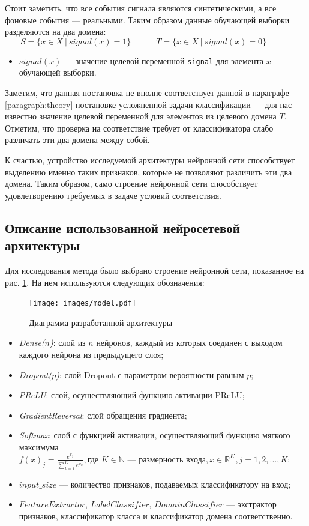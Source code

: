 \documentclass[14pt, a4paper]{extarticle}
\begin{document}
Стоит заметить, что все события сигнала являются синтетическими, а все фоновые события — реальными. Таким образом данные обучающей выборки разделяются на два домена:
\begin{equation*}
	S = \{ x \in X~|~signal(x) = 1 \} \quad \quad \quad
	T = \{ x \in X~|~signal(x) = 0 \} \quad \quad \quad
\end{equation*}
\begin{itemize}
	\item $signal(x)$ — значение целевой переменной \texttt{signal} для элемента $x$ обучающей выборки.
\end{itemize}

Заметим, что данная постановка не вполне соответствует данной в параграфе \ref{paragraph:theory} постановке усложненной задачи классификации — для нас известно значение целевой переменной для элементов из целевого домена $T$. Отметим, что проверка на соответствие требует от классификатора слабо различать эти два домена между собой.

К счастью, устройство исследуемой архитектуры нейронной сети способствует выделению именно таких признаков, которые не позволяют различить эти два домена. Таким образом, само строение нейронной сети способствует удовлетворению требуемых в задаче условий соответствия.

\subsection*{Описание использованной нейросетевой архитектуры}

Для исследования метода было выбрано строение нейронной сети, показанное на рис. \ref{fig:neural_net}. На нем используются следующих обозначения:

\begin{figure}
	\centering
	\texttt{[image: images/model.pdf]}
	\caption{Диаграмма разработанной архитектуры}
	\label{fig:neural_net}
\end{figure}

\begin{itemize}
	\item \textit{Dense($n$)}: слой из $n$ нейронов, каждый из которых соединен с выходом каждого нейрона из предыдущего слоя;
	\item \textit{Dropout($p$)}: слой Dropout с параметром вероятности равным $p$;
	\item \textit{PReLU}: слой, осуществляющий функцию активации PReLU;
	\item \textit{GradientReversal}: слой обращения градиента;
	\item \textit{Softmax}: слой с функцией активации, осуществляющий функцию мягкого максимума \\ $f(x)_j = \frac{e^{x_j}}{\sum_{k=1}^K e^{x_k}}, \text{где~} K \in \mathbb{N} \text{ — размерность входа}, x \in \mathbb{R}^K, j=1,2,..., K$;
	\item $input\_size$ — количество признаков, подаваемых классификатору на вход;
	\item $Feature Extractor$, $Label Classifier$, $Domain Classifier$ — экстрактор признаков, классификатор класса и классификатор домена соответственно.
\end{itemize}
\end{document}
